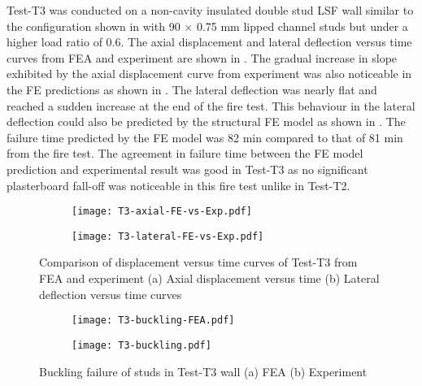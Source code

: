 Test-T3 was conducted on a non-cavity insulated double stud LSF wall similar to the configuration shown in  with 90 $\times$ 0.75 mm lipped channel studs but under a higher load ratio of 0.6. The axial displacement and lateral deflection versus time curves from FEA and experiment are shown in . The gradual increase in slope exhibited by the axial displacement curve from experiment was also noticeable in the FE predictions as shown in . The lateral deflection was nearly flat and reached a sudden increase at the end of the fire test. This behaviour in the lateral deflection could also be predicted by the structural FE model as shown in . The failure time predicted by the FE model was 82 min compared to that of 81 min from the fire test. The agreement in failure time between the FE model prediction and experimental result was good in Test-T3 as no significant plasterboard fall-off was noticeable in this fire test unlike in Test-T2.
\begin{figure}[!htbp]
	\centering
	\begin{subfigure}[b]{0.7\textwidth}
		\centering
		\texttt{[image: T3-axial-FE-vs-Exp.pdf]}
		\caption{}
		\label{subfig:T3-axial-FE-vs-Exp}
	\end{subfigure}
	\begin{subfigure}[b]{0.7\textwidth}
		\centering
		\texttt{[image: T3-lateral-FE-vs-Exp.pdf]}
		\caption{}
		\label{subfig:T3-lateral-FE-vs-Exp}
	\end{subfigure}
	   \caption{Comparison of displacement versus time curves of Test-T3 from FEA and experiment (a) Axial displacement versus time (b) Lateral deflection versus time curves}
	   \label{fig:T3-structural-FE-vs-Exp}
\end{figure} 
\begin{figure}[!htbp]
	\centering
	\begin{subfigure}[b]{0.85\textwidth}
		\centering
		\texttt{[image: T3-buckling-FEA.pdf]}
		\caption{}
		\label{subfig:T3-buckling-FEA}
	\end{subfigure}
	\begin{subfigure}[b]{0.5\textwidth}
		\centering
		\texttt{[image: T3-buckling.pdf]}
		\caption{}
		\label{subfig:T3-buckling-FEA-Exp}
	\end{subfigure}
	   \caption{Buckling failure of studs in Test-T3 wall (a) FEA (b) Experiment}
	   \label{fig:T3-buckling-FE-vs-Exp}
\end{figure} 

